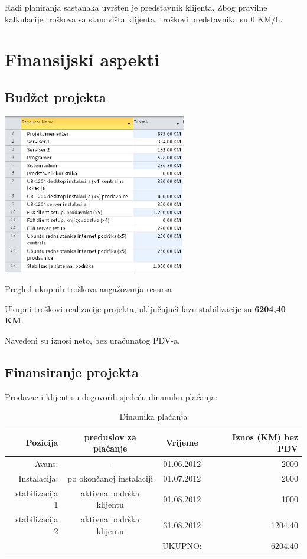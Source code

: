\documentclass[times, utf8, seminar]{fit}
\begin{document}
Radi planiranja sastanaka uvršten je predstavnik klijenta. Zbog pravilne kalkulacije troškova sa stanovišta klijenta, troškovi predstavnika su 0 KM/h.

\pagebreak
\section{Finansijski aspekti}
\subsection{Budžet projekta}
\begin{table}[!h]
\centering
\includegraphics[height=7cm]{img/troskovi.png}
\caption{Pregled ukupnih troškova angažovanja resursa}
\end{table}

Ukupni troškovi realizacije projekta, uključujući fazu stabilizacije su \textbf{6204,40 KM}.

Navedeni su iznosi neto, bez uračunatog PDV-a.

\subsection{Finansiranje projekta}

Prodavac i klijent su dogovorili sjedeću dinamiku plaćanja:

\begin{table}[h]
\centering
\resizebox{15cm}{!} {
\begin{tabular}{ | r | c | c | r | }
\hline
Pozicija & preduslov za plaćanje & Vrijeme & Iznos (KM) bez PDV \\ \hline\hline
Avans: & - & 01.06.2012 & 2000 \\ \hline
Instalacija: & po okončanoj instalaciji & 01.07.2012 & 2000 \\ \hline
stabilizacija 1 & aktivna podrška klijentu & 01.08.2012 & 1000 \\ \hline 
stabilizacija 2 & aktivna podrška klijentu & 31.08.2012 & 1204.40 \\ \hline\hline 
                &                          &    UKUPNO: & 6204.40 \\ \hline
\end{tabular}
}
\caption{Dinamika plaćanja}
\end{table}
\end{document}
